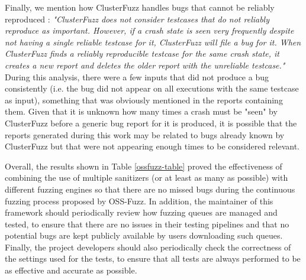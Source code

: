 Finally, we mention how ClusterFuzz handles bugs that cannot be reliably reproduced \cite{unreliable}: \textit{"ClusterFuzz does not consider testcases that do not reliably reproduce as important. However, if a crash state is seen very frequently despite not having a single reliable testcase for it, ClusterFuzz will file a bug for it. When ClusterFuzz finds a reliably reproducible testcase for the same crash state, it creates a new report and deletes the older report with the unreliable testcase."} During this analysis, there were a few inputs that did not produce a bug consistently (i.e. the bug did not appear on all executions with the same testcase as input), something that was obviously mentioned in the reports containing them. Given that it is unknown how many times a crash must be "seen" by ClusterFuzz before a generic bug report for it is produced, it is possible that the reports generated during this work may be related to bugs already known by ClusterFuzz but that were not appearing enough times to be considered relevant.

Overall, the results shown in Table \ref{ossfuzz-table} proved the effectiveness of combining the use of multiple sanitizers (or at least as many as possible) with different fuzzing engines so that there are no missed bugs during the continuous fuzzing process proposed by OSS-Fuzz. In addition, the maintainer of this framework should periodically review how fuzzing queues are managed and tested, to ensure that there are no issues in their testing pipelines and that no potential bugs are kept publicly available by users downloading such queues. Finally, the project developers should also periodically check the correctness of the settings used for the tests, to ensure that all tests are always performed to be as effective and accurate as possible.  

